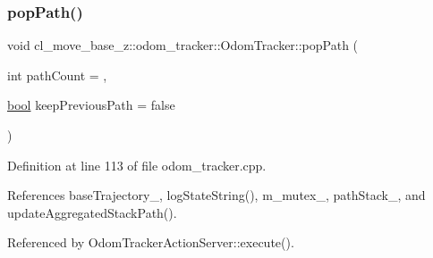 \subsubsection{\texorpdfstring{pop\+Path()}{popPath()}}
{\footnotesize\ttfamily void cl\+\_\+move\+\_\+base\+\_\+z\+::odom\+\_\+tracker\+::\+Odom\+Tracker\+::pop\+Path (\begin{DoxyParamCaption}\item[{int}]{path\+Count = {},  }\item[{\hyperlink{classbool}{bool}}]{keep\+Previous\+Path = {\ttfamily false} }\end{DoxyParamCaption})}



Definition at line 113 of file odom\+\_\+tracker.\+cpp.



References base\+Trajectory\+\_\+, log\+State\+String(), m\+\_\+mutex\+\_\+, path\+Stack\+\_\+, and update\+Aggregated\+Stack\+Path().



Referenced by Odom\+Tracker\+Action\+Server\+::execute().


